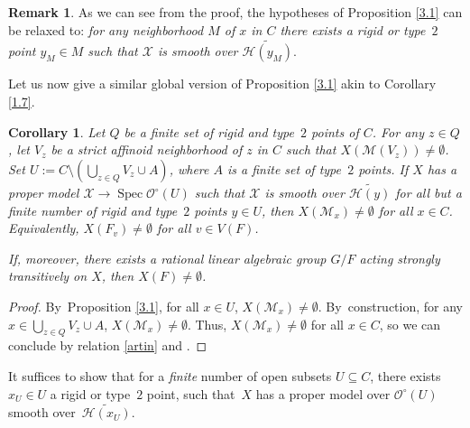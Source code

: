 \documentclass[JEP,XML,SOM,Unicode,NoFloatCountersInSection,published]{cedram}
\DeclareMathOperator{\Spec}{Spec}
\let\backslash\setminus
\newtheorem{cor}[thm]{Corollary}
\theoremstyle{definition}
\newtheorem{rem}[thm]{Remark}
\begin{document}
\begin{rem} \label{3.2}
As we can see from the proof, the hypotheses of Proposition \ref{3.1} can be relaxed to: \emph{for any neighborhood $M$ of $x$ in $C$ there exists a rigid or type~$2$ point $y_M \in M$ such that $\mathcal{X}$ is smooth over $\widetilde{\mathcal{H}(y_M)}$}.
\end{rem}

Let us now give a similar global version of Proposition \ref{3.1} akin to Corollary \ref{1.7}.

\begin{cor} \label{3.3}
Let $Q$ be a finite set of rigid and type~$2$ points of $C$. For any $z \in Q$, let $V_z$ be a strict affinoid neighborhood of $z$ in $C$ such that $X(\mathscr{M}(V_z)) \neq \emptyset$. Set $U:=C \backslash (\bigcup_{z \in Q} V_z \cup A)$, where $A$ is a finite set of type~$2$ points. If $X$ has a proper model $\mathcal{X} \to \Spec \mathcal{O}^{\circ}(U)$ such that $\mathcal{X}$ is smooth over $\widetilde{\mathcal{H}(y)}$ for all but a finite number of \emph{rigid} and \emph{type~$2$} points $y \in U$,
then $X(\mathscr{M}_x) \neq \emptyset$ for all $x \in C$. Equivalently, $X(F_v) \neq \emptyset$ for all $v \in V(F)$.

If, moreover, there exists a rational linear algebraic group $G/F$ acting strongly transitively on $X$, then $X(F) \neq \emptyset$.
\end{cor}

\begin{proof}
By~Proposition \ref{3.1}, for all ${x \in U}$, ${X(\mathscr{M}_x) \neq \emptyset}$. By~construction, for any $x \in \bigcup_{z \in Q} V_z \cup A$, ${X(\mathscr{M}_x) \neq \emptyset}$. Thus, $X(\mathscr{M}_x) \neq \emptyset$ for all $x \in C$, so we can conclude by relation \eqref{artin} and \cite[Cor.\,3.18]{une}.
\end{proof}

It suffices to show that for a \emph{finite} number of open subsets $U \subseteq C$, there exists $x_U \in U$ a rigid or type~$2$ point, such that~$X$ has a proper model over $\mathcal{O}^{\circ}(U)$ smooth over~$\widetilde{\mathcal{H}(x_U)}$.
\end{document}
